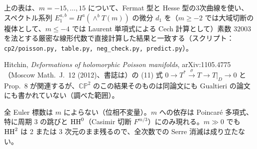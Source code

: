 \begin{rem}[\tV]
上の表は、$m=-15,\dots,15$ について、Fermat 型と Hesse 型の3次曲線を使い、スペクトル系列 $E_1^{a,b}=H^a(\wedge^bT(m))$ の微分 $d_1$ を（$m\ge-2$ では大域切断の複体として、$m\le-4$ では Laurent 単項式による Cech 計算として）素数 $32003$ を法とする厳密な線形代数で直接計算した結果と一致する（スクリプト：\texttt{cp2/poisson.py, table.py, neg\_check.py, predict.py}）。
\end{rem}
\begin{rem}[\tC\ 関連]
Hitchin, \emph{Deformations of holomorphic Poisson manifolds}, arXiv:1105.4775（Moscow Math.\ J.\ 12 (2012)、書誌は\tQ）の (11) 式 $0\to T^*\xrightarrow{\sigma}T\to T|_D\to0$ と Prop.\ 8 が関連するが、$\mathbb{CP}^2$ のこの結果そのものは同論文にも Gualtieri の論文にも書かれていない（調べた範囲）。
\end{rem}

\begin{obs}\tP
全 Euler 標数は $m$ によらない（位相不変量）。$m$ への依存は Poincaré 多項式、特に周期 3 の跳びと $\mathrm{HH}^0$（Casimir 切断 $F^{m/3}$）にのみ現れる。$m\gg0$ でも $\mathrm{HH}^2$ は 2 または 3 次元のまま残るので、全次数での Serre 消滅は成り立たない。
\end{obs}
